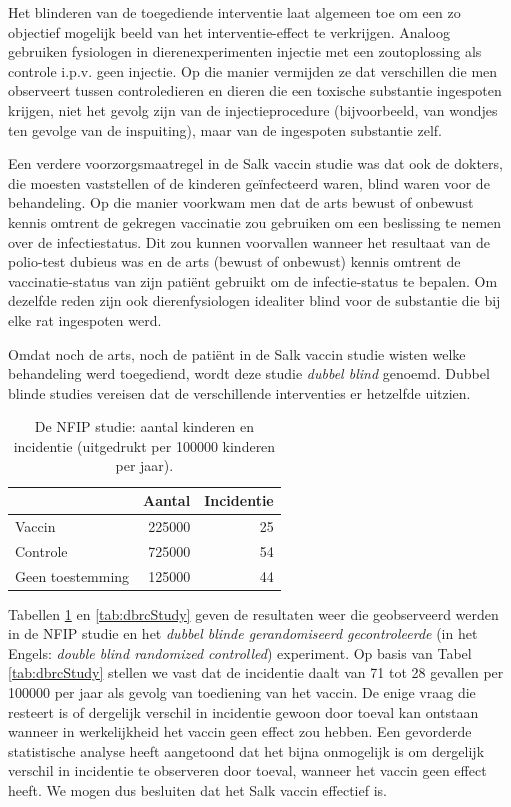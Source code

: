 \documentclass[
  12pt,dutch]{book}
\theoremstyle{definition}
\theoremstyle{definition}
\theoremstyle{definition}
\theoremstyle{definition}
\theoremstyle{remark}
\begin{document}
Het blinderen van de toegediende interventie laat algemeen toe om een zo objectief mogelijk
beeld van het interventie-effect te verkrijgen. Analoog gebruiken fysiologen in dierenexperimenten injectie met een zoutoplossing als controle i.p.v. geen injectie. Op die manier vermijden ze dat verschillen die men observeert tussen controledieren en dieren die een toxische substantie ingespoten krijgen, niet het gevolg zijn van de injectieprocedure (bijvoorbeeld, van wondjes ten gevolge van de inspuiting), maar van de ingespoten substantie zelf.

Een verdere voorzorgsmaatregel in de Salk vaccin studie was dat ook de
dokters, die moesten vaststellen of de kinderen geïnfecteerd waren,
blind waren voor de behandeling. Op die manier voorkwam men dat de arts
bewust of onbewust kennis omtrent de gekregen vaccinatie zou gebruiken om
een beslissing te nemen over de infectiestatus. Dit zou kunnen voorvallen
wanneer het resultaat van de polio-test dubieus was en de arts (bewust of
onbewust) kennis omtrent de vaccinatie-status van zijn patiënt gebruikt om
de infectie-status te bepalen. Om dezelfde reden zijn ook dierenfysiologen idealiter blind voor de substantie die bij elke rat ingespoten werd.

Omdat noch de arts, noch de patiënt in de Salk vaccin studie wisten welke
behandeling werd toegediend, wordt deze studie \emph{dubbel blind}
genoemd. Dubbel blinde studies vereisen dat de verschillende interventies er
hetzelfde uitzien.

\begin{table}

\caption{\label{tab:nfipStudy}De NFIP studie: aantal kinderen en incidentie (uitgedrukt per
100000 kinderen per jaar).}
\centering
\begin{tabular}[t]{lrr}
\toprule
  & Aantal & Incidentie\\
\midrule
Vaccin & 225000 & 25\\
Controle & 725000 & 54\\
Geen toestemming & 125000 & 44\\
\bottomrule
\end{tabular}
\end{table}

Tabellen \ref{tab:nfipStudy} en \ref{tab:dbrcStudy} geven de resultaten weer die geobserveerd
werden in de NFIP studie en het \emph{dubbel blinde gerandomiseerd
gecontroleerde} (in het Engels: \emph{double blind randomized controlled})
experiment. Op basis van Tabel \ref{tab:dbrcStudy} stellen we vast dat de incidentie
daalt van 71 tot 28 gevallen per 100000 per jaar als gevolg van
toediening van het vaccin. De enige vraag die resteert is of dergelijk
verschil in incidentie gewoon door toeval kan ontstaan wanneer in
werkelijkheid het vaccin geen effect zou hebben. Een gevorderde statistische analyse heeft aangetoond dat het bijna onmogelijk is om dergelijk verschil in incidentie
te observeren door toeval, wanneer het vaccin geen effect heeft. We mogen
dus besluiten dat het Salk vaccin effectief is.
\end{document}
